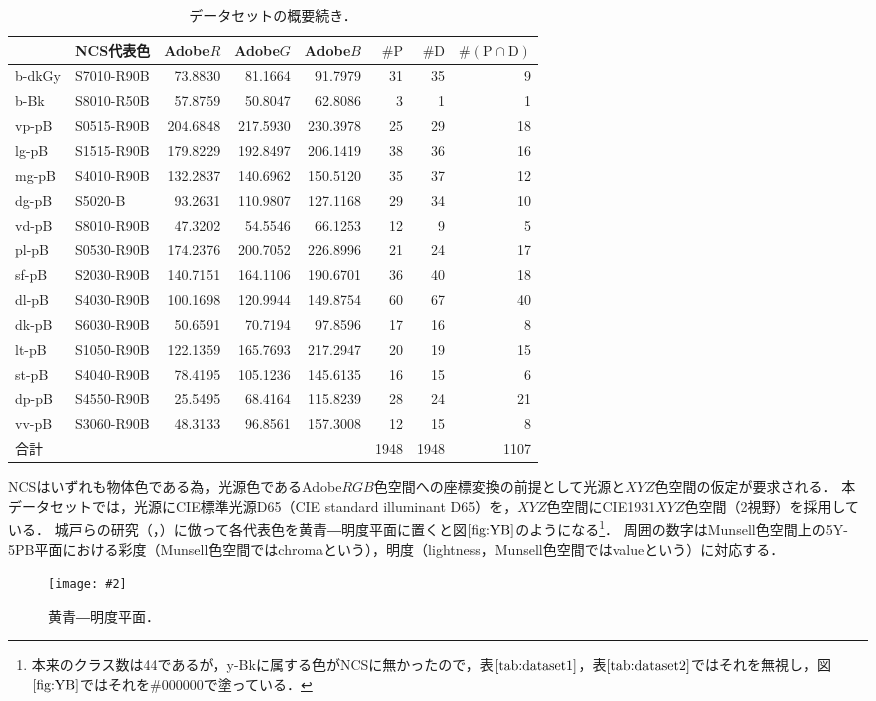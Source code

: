 \documentclass[uplatex,paper=a4,fontsize=4.0truemm,jafontsize=4.0truemm,head_space=30.0truemm,foot_space=30.0truemm,baselineskip=8.0truemm,line_length=40zw,gutter=25.0truemm,oneside,openany,fleqn,hanging_panctuation,open_bracket_pos=nibu_tentsuki,dvipdfmx,jis2004,book,titlepage]{jlreq}
\theoremstyle{mystyle}
\newcommand{\zwspace}{\hspace{1zw}\relax}
\newcommand{\captiondot}[1]{\caption{#1．}}
\newcommand{\figureinput}[4]{\begin{figure}[tbp]\centering\texttt{[image: \#2]}\captiondot{#3}\label{fig:#4}\end{figure}}
\newcommand{\tableinput}[4]{\begin{table}[tbp]\centering\captiondot{#3}\label{tab:#4}\begin{tabular}{#1}#2\end{tabular}\end{table}}
\newcommand{\mathdisplaystyle}[1]{\(\displaystyle{#1}\)}
\newcommand{\Reference}[1]{\mathdisplaystyle{\ref{#1}}}
\newcommand{\parentheses}[1]{\left(#1\right)}
\begin{document}
			\tableinput{l|lrrrrrr}{ & NCS代表色 & Adobe\(R\) & Adobe\(G\) & Adobe\(B\) & \(\#\textrm{P}\) & \(\#\textrm{D}\) & \(\#\parentheses{\text{P}\cap\text{D}}\) \\ \hline
				b-dkGy & S7010-R90B & 73.8830 & 81.1664 & 91.7979 & 31 & 35 & 9 \\
				b-Bk & S8010-R50B & 57.8759 & 50.8047 & 62.8086 & 3 & 1 & 1 \\
				vp-pB & S0515-R90B & 204.6848 & 217.5930 & 230.3978 & 25 & 29 & 18 \\
				lg-pB & S1515-R90B & 179.8229 & 192.8497 & 206.1419 & 38 & 36 & 16 \\
				mg-pB & S4010-R90B & 132.2837 & 140.6962 & 150.5120 & 35 & 37 & 12 \\
				dg-pB & S5020-B & 93.2631 & 110.9807 & 127.1168 & 29 & 34 & 10 \\
				vd-pB & S8010-R90B & 47.3202 & 54.5546 & 66.1253 & 12 & 9 & 5 \\
				pl-pB & S0530-R90B & 174.2376 & 200.7052 & 226.8996 & 21 & 24 & 17 \\
				sf-pB & S2030-R90B & 140.7151 & 164.1106 & 190.6701 & 36 & 40 & 18 \\
				dl-pB & S4030-R90B & 100.1698 & 120.9944 & 149.8754 & 60 & 67 & 40 \\
				dk-pB & S6030-R90B & 50.6591 & 70.7194 & 97.8596 & 17 & 16 & 8 \\
				lt-pB & S1050-R90B & 122.1359 & 165.7693 & 217.2947 & 20 & 19 & 15 \\
				st-pB & S4040-R90B & 78.4195 & 105.1236 & 145.6135 & 16 & 15 & 6 \\
				dp-pB & S4550-R90B & 25.5495 & 68.4164 & 115.8239 & 28 & 24 & 21 \\
				vv-pB & S3060-R90B & 48.3133 & 96.8561 & 157.3008 & 12 & 15 & 8 \\ \hline
				合計 &  &  &  &  & 1948 & 1948 & 1107}{データセットの概要\zwspace 続き}{dataset2}
			NCSはいずれも物体色である為，光源色であるAdobe\mathdisplaystyle{RGB}色空間への座標変換の前提として光源と\mathdisplaystyle{XYZ}色空間の仮定が要求される．
			本データセットでは，光源にCIE標準光源D65（CIE standard illuminant D65）を，\mathdisplaystyle{XYZ}色空間にCIE1931\mathdisplaystyle{XYZ}色空間（2\textdegree 視野）\cite[pp.~28--30]{Yaguchi2017a}を採用している．
			城戸らの研究（\cite[図1]{Kido2017}，\cite[図1]{Kido2018}）に倣って各代表色を黄青―明度平面に置くと図\Reference{fig:YB}のようになる\footnote{本来のクラス数は44であるが，y-Bkに属する色がNCSに無かったので，表\Reference{tab:dataset1}，表\Reference{tab:dataset2}ではそれを無視し，図\Reference{fig:YB}ではそれを\#000000で塗っている．}．
			周囲の数字はMunsell色空間上の5Y-5PB平面における彩度（Munsell色空間ではchromaという），明度（lightness，Munsell色空間ではvalueという）に対応する．
			\figureinput{width=\linewidth}{D:/a/figs/YB.png}{黄青―明度平面}{YB}
\end{document}
